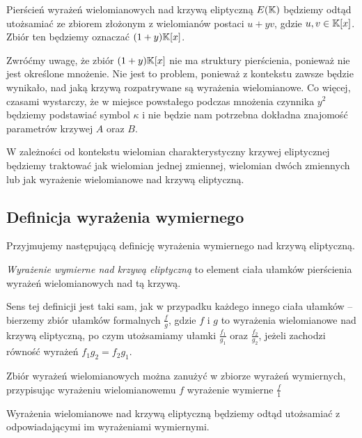\begin{remark}
Pierścień wyrażeń wielomianowych nad krzywą eliptyczną $E(\mathbb{K})$
będziemy odtąd utożsamiać ze zbiorem
złożonym z wielomianów postaci $u + yv$,
gdzie $u, v \in \mathbb{K}[x]$.
Zbiór ten będziemy oznaczać $(1 + y)\mathbb{K}[x]$.
\end{remark}

Zwróćmy uwagę, że zbiór $(1 + y)\mathbb{K}[x]$ nie ma struktury pierścienia,
ponieważ nie jest określone mnożenie.
Nie jest to problem,
ponieważ z kontekstu zawsze będzie wynikało,
nad jaką krzywą rozpatrywane są wyrażenia wielomianowe.
Co więcej, czasami wystarczy,
że w miejsce powstałego podczas mnożenia czynnika $y^2$
będziemy podstawiać symbol $\kappa$
i nie będzie nam potrzebna dokładna znajomość parametrów krzywej $A$ oraz $B$.

\begin{remark}
W zależności od kontekstu wielomian charakterystyczny krzywej eliptycznej
będziemy traktować jak wielomian jednej zmiennej, wielomian dwóch zmiennych
lub jak wyrażenie wielomianowe nad krzywą eliptyczną.
\end{remark}

\subsection*{Definicja wyrażenia wymiernego}

Przyjmujemy następującą definicję
wyrażenia wymiernego nad krzywą eliptyczną.

\begin{definition}
\emph{Wyrażenie wymierne nad krzywą eliptyczną}
to element ciała ułamków pierścienia wyrażeń wielomianowych nad tą krzywą.
\end{definition}

Sens tej definicji jest taki sam,
jak w przypadku każdego innego ciała ułamków --
bierzemy zbiór ułamków formalnych $\frac{f}{g}$,
gdzie $f$ i $g$ to wyrażenia wielomianowe nad krzywą eliptyczną,
po czym utożsamiamy ułamki $\frac{f_1}{g_1}$ oraz $\frac{f_2}{g_2}$,
jeżeli zachodzi równość wyrażeń $f_1g_2 = f_2g_1$.

\begin{fact}
Zbiór wyrażeń wielomianowych można zanużyć w zbiorze wyrażeń wymiernych,
przypisując wyrażeniu wielomianowemu $f$ wyrażenie wymierne $\frac{f}{1}$
\end{fact}

\begin{remark}
Wyrażenia wielomianowe nad krzywą eliptyczną
będziemy odtąd utożsamiać z odpowiadającymi im wyrażeniami wymiernymi.
\end{remark}

